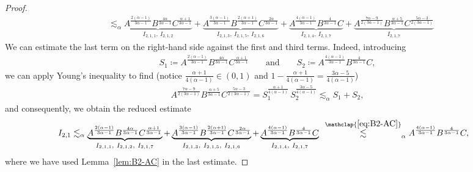 \documentclass[reqno,12pt]{amsart}
\numberwithin{equation}{section}
\begin{document}
\begin{proof}
\begin{align*}
    &\lesssim_\alpha
    \underbrace{A^\frac{2(\alpha-1)}{3\alpha-1}
    B^\frac{4\alpha}{3\alpha-1}
    C^\frac{\alpha+1}{3\alpha-1}
    }_{I_{2,1,1}, \ I_{2,1,2}}
    +
    \underbrace{
    A^\frac{3(\alpha-1)}{3\alpha-1}
    B^\frac{2(\alpha+1)}{3\alpha-1}
    C^\frac{2\alpha}{3\alpha-1}
    }_{I_{2,1,3},\ I_{2,1,5},\ I_{2,1,6}}
    +
    \underbrace{
    A^\frac{4(\alpha-1)}{3\alpha-1}
    B^\frac{4}{3\alpha-1}
    C
    }_{I_{2,1,4},\ I_{2,1,7}}
    +
    \underbrace{A^{\frac{7\alpha-9}{2(3\alpha-1)}} 
    B^{\frac{\alpha+5}{3\alpha-1}} 
    C^\frac{5\alpha-3}{2(3\alpha-1)}}_{I_{2,1,7}}
\end{align*}
We can estimate the last term on the right-hand side against the first and third terms. Indeed, introducing 
%
\begin{align*}
    S_1 \coloneqq A^\frac{2(\alpha-1)}{3\alpha-1}
    B^\frac{4\alpha}{3\alpha-1}
    C^\frac{\alpha+1}{3\alpha-1} \qquad 
    \text{and}\qquad S_2 \coloneqq A^\frac{4(\alpha-1)}{3\alpha-1}
    B^\frac{4}{3\alpha-1}
    C,
\end{align*}
%
we can apply Young's inequality to find (notice $\tfrac{\alpha+1}{4(\alpha-1)} \in (0,1)$ and $1 -\tfrac{\alpha+1}{4(\alpha-1)} = \tfrac{3\alpha -5}{4(\alpha-1)}$)
%
\begin{align*}
    A^{\frac{7\alpha-9}{2(3\alpha-1)}} 
    B^{\frac{\alpha+5}{3\alpha-1}} 
    C^\frac{5\alpha-3}{2(3\alpha-1)} = S_1^\frac{\alpha+1}{4(\alpha-1)}\, S_2^\frac{3\alpha-5}{4(\alpha-1)} \lesssim_\alpha  S_1 + S_2, 
\end{align*}
%
and consequently, we obtain the reduced estimate
%
\begin{align}\label{nonlinear-i21}
    I_{2,1}
    &\lesssim_\alpha
    \underbrace{A^\frac{2(\alpha-1)}{3\alpha-1}
    B^\frac{4\alpha}{3\alpha-1}
    C^\frac{\alpha+1}{3\alpha-1}
    }_{I_{2,1,1}, \ I_{2,1,2}, \ I_{2,1,7}}
    +
    \underbrace{
    A^\frac{3(\alpha-1)}{3\alpha-1}
    B^\frac{2(\alpha+1)}{3\alpha-1}
    C^\frac{2\alpha}{3\alpha-1}
    }_{I_{2,1,3},\ I_{2,1,5},\ I_{2,1,6}}
    +
    \underbrace{
    A^\frac{4(\alpha-1)}{3\alpha-1}
    B^\frac{4}{3\alpha-1}
    C
    }_{I_{2,1,4},\ I_{2,1,7}} \;\, \stackrel{\mathclap{\eqref{eq:B2-AC}}}{\lesssim}_\alpha A^\frac{4(\alpha-1)}{3\alpha-1}
    B^\frac{4}{3\alpha-1}
    C,
\end{align}
%
where we have used Lemma~\ref{lem:B2-AC} in the last estimate.

%
\bigskip
%


\end{proof}
\end{document}
